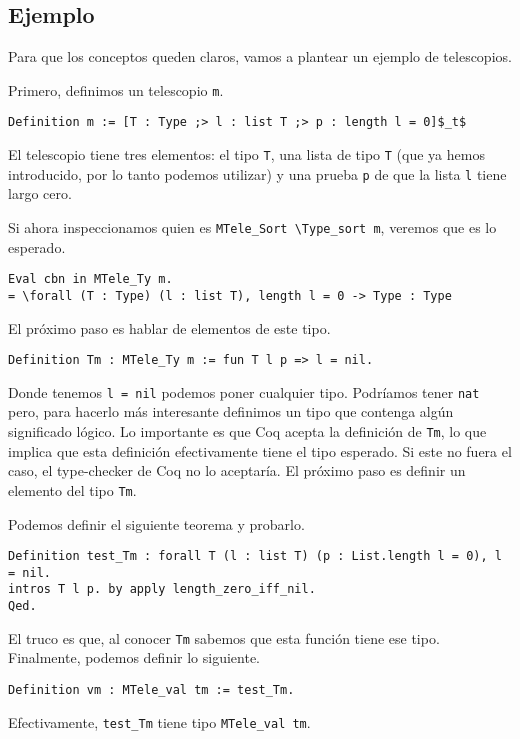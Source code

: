 \subsection{Ejemplo}

Para que los conceptos queden claros, vamos a plantear un ejemplo de telescopios.

Primero, definimos un telescopio \lstinline{m}.

\begin{lstlisting}
Definition m := [T : Type ;> l : list T ;> p : length l = 0]$_t$
\end{lstlisting}

El telescopio tiene tres elementos: el tipo \lstinline{T}, una lista de tipo \lstinline{T} (que ya hemos introducido, por lo tanto podemos utilizar) y una prueba \lstinline{p} de que la lista \lstinline{l} tiene largo cero.

Si ahora inspeccionamos quien es \lstinline{MTele_Sort \Type_sort m}, veremos que es lo esperado.

\begin{lstlisting}
Eval cbn in MTele_Ty m.
= \forall (T : Type) (l : list T), length l = 0 -> Type : Type
\end{lstlisting}

El próximo paso es hablar de elementos de este tipo.

\begin{lstlisting}
Definition Tm : MTele_Ty m := fun T l p => l = nil.
\end{lstlisting}

Donde tenemos \lstinline{l = nil} podemos poner cualquier tipo.
Podríamos tener \lstinline{nat} pero, para hacerlo más interesante definimos un tipo que contenga algún significado lógico.
Lo importante es que Coq acepta la definición de \lstinline{Tm}, lo que implica que esta definición efectivamente tiene el tipo esperado.
Si este no fuera el caso, el type-checker de Coq no lo aceptaría.
El próximo paso es definir un elemento del tipo \lstinline{Tm}.

Podemos definir el siguiente teorema y probarlo.

\begin{lstlisting}
Definition test_Tm : forall T (l : list T) (p : List.length l = 0), l = nil.
intros T l p. by apply length_zero_iff_nil.
Qed.
\end{lstlisting}

El truco es que, al conocer \lstinline{Tm} sabemos que esta función tiene ese tipo.
Finalmente, podemos definir lo siguiente.

\begin{lstlisting}
Definition vm : MTele_val tm := test_Tm.
\end{lstlisting}

Efectivamente, \lstinline{test_Tm} tiene tipo \lstinline{MTele_val tm}.
